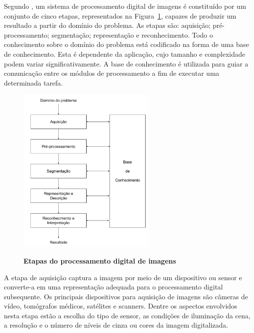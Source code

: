 \documentclass[12pt,oneside,a4paper,english,french,spanish,brazil,]{abntex2}
\begin{document}
Segundo \citet{pedrini:2008}, um sistema de processamento digital de imagens é constituído por um conjunto de cinco etapas, representados na Figura~\ref{fig:PDI_Etapas_PDI}, capazes de produzir um resultado a partir do domínio do problema. As etapas são: aquisição; pré-processamento; segmentação; representação e reconhecimento. Todo o conhecimento sobre o domínio do problema está codificado na forma de uma base de conhecimento. Esta é dependente da aplicação, cujo tamanho e complexidade podem variar significativamente. A base de conhecimento é utilizada para guiar a comunicação entre os módulos de processamento a fim de executar uma determinada tarefa.

\begin{figure}[ht]
\centering
\caption{\textbf{Etapas do processamento digital de imagens}}
\includegraphics[width=0.6\textwidth]{imagens/PDI_Etapas_PDI.pdf}
\label{fig:PDI_Etapas_PDI}
\end{figure}

A etapa de aquisição captura a imagem por meio de um dispositivo ou sensor e converte-a em uma representação adequada para o processamento digital subsequente. Os principais dispositivos para aquisição de imagens são câmeras de vídeo, tomógrafos médicos, satélites e scanners. Dentre os aspectos envolvidos nesta etapa estão a escolha do tipo de sensor, as condições de iluminação da cena, a resolução e o número de níveis de cinza ou cores da imagem digitalizada.
\end{document}
